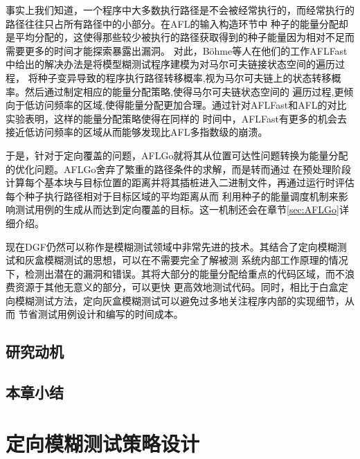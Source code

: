 \documentclass[bachelor]{njupthesis}
\begin{document}
事实上我们知道，一个程序中大多数执行路径是不会被经常执行的，而经常执行的路径往往只占所有路径中的小部分。在AFL的输入构造环节中
种子的能量分配却是平均分配的，这使得那些较少被执行的路径获取得到的种子能量因为相对不足而需要更多的时间才能探索暴露出漏洞。
对此，Böhme等人在他们的工作AFLFast\cite{2016Coverage}中给出的解决办法是将模型糊测试程序建模为对马尔可夫链接状态空间的遍历过程，
将种子变异导致的程序执行路径转移概率,视为马尔可夫链上的状态转移概率。然后通过制定相应的能量分配策略,使得马尔可夫链状态空间的
遍历过程,更倾向于低访问频率的区域,使得能量分配更加合理。通过针对AFLFast和AFL的对比实验表明，这样的能量分配策略使得在同样的
时间中，AFLFast有更多的机会去接近低访问频率的区域从而能够发现比AFL多指数级的崩溃\cite{2016Coverage}。

于是，针对于定向覆盖的问题，AFLGo就将其从位置可达性问题转换为能量分配的优化问题。AFLGo舍弃了繁重的路径条件的求解，而是转而通过
在预处理阶段计算每个基本块与目标位置的距离并将其插桩进入二进制文件，再通过运行时评估每个种子执行路径相对于目标区域的平均距离从而
利用种子的能量调度机制来影响测试用例的生成从而达到定向覆盖的目标。这一机制还会在章节\ref{sec:AFLGo}详细介绍。

现在DGF仍然可以称作是模糊测试领域中非常先进的技术。其结合了定向模糊测试和灰盒模糊测试的思想，可以在不需要完全了解被测
系统内部工作原理的情况下，检测出潜在的漏洞和错误。其将大部分的能量分配给重点的代码区域，而不浪费资源于其他无意义的部分，可以更快
更高效地测试代码。同时，相比于白盒定向模糊测试方法，定向灰盒模糊测试可以避免过多地关注程序内部的实现细节，从而
节省测试用例设计和编写的时间成本。
\section{研究动机}
\section{本章小结}

\chapter{定向模糊测试策略设计}
\end{document}
